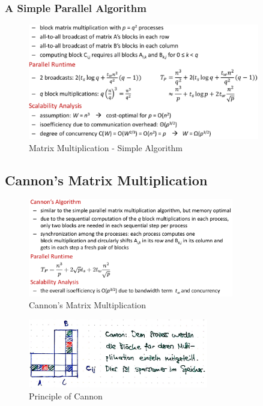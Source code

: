 \hypertarget{a-simple-parallel-algorithm}{%
\subsubsection{A Simple Parallel
Algorithm}\label{a-simple-parallel-algorithm}}

\begin{figure}[H]
\centering
\includegraphics[width=0.9\textwidth]{figures/matrixMatrixMultiplication2.png}
\caption{Matrix Multiplication - Simple Algorithm}
\end{figure}

\hypertarget{cannons-matrix-multiplication}{%
\subsection{Cannon's Matrix
Multiplication}\label{cannons-matrix-multiplication}}

\begin{figure}[H]
\centering
\includegraphics[width=0.8\textwidth]{figures/cannon.png}
\caption{Cannon's Matrix Multiplication}
\end{figure}

\begin{figure}[H]
\centering
\includegraphics[width=0.7\textwidth]{figures/matrix-mult-cannon.png}
\caption{Principle of Cannon}
\end{figure}

